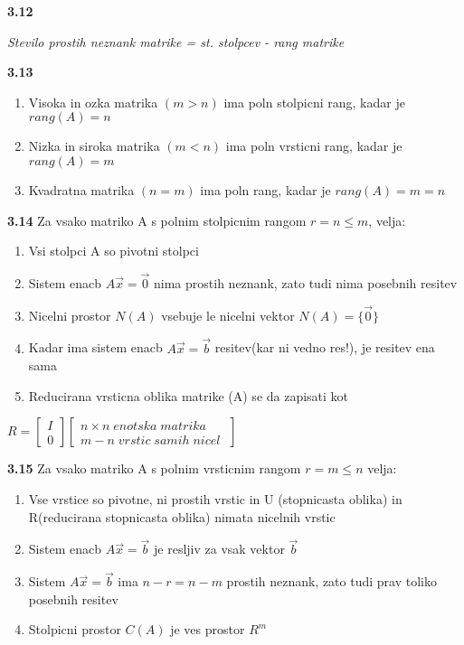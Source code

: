 \documentclass{article}
\begin{document}
\begin{multicols}{2}
	\textbf{3.12}
	\begin{center}
		\textit{Stevilo prostih neznank matrike = st. stolpcev - rang matrike}
	\end{center}

	\textbf{3.13}
	\begin{enumerate}
		\item Visoka in ozka matrika $(m > n)$ ima poln stolpicni rang, kadar je $rang(A) = n$
		\item Nizka in siroka matrika $(m < n)$ ima poln vrsticni rang, kadar je $rang(A) = m$
		\item Kvadratna matrika $(n = m)$ ima poln rang, kadar je $rang(A) = m = n$
	\end{enumerate}

	\textbf{3.14} Za vsako matriko A s polnim stolpicnim rangom $r = n \leq m$, velja:
	\begin{enumerate}
		\item Vsi stolpci A so pivotni stolpci
		\item Sistem enacb $A\vec{x} = \vec{0}$ nima prostih neznank, zato tudi nima posebnih resitev
		\item Nicelni prostor $N(A)$ vsebuje le nicelni vektor $N(A) = \{\vec{0}\}$
		\item Kadar ima sistem enacb $A\vec{x} = \vec{b}$ resitev(kar ni vedno res!), je resitev ena sama
		\item Reducirana vrsticna oblika matrike (A) se da zapisati kot
	\end{enumerate}
	\begin{center}
		$R =
			\begin{bmatrix}
				I \\
				0
			\end{bmatrix}
			\begin{bmatrix}
				n \times n\; enotska\; matrika \\
				m - n\; vrstic\; samih\; nicel\;
			\end{bmatrix}
		$
	\end{center}

	\textbf{3.15} Za vsako matriko A s polnim vrsticnim rangom $r = m \leq n$ velja:
	\begin{enumerate}
		\item Vse vrstice so pivotne, ni prostih vrstic in U (stopnicasta oblika) in R(reducirana stopnicasta oblika) nimata nicelnih vrstic
		\item Sistem enacb $A\vec{x} = \vec{b}$ je resljiv za vsak vektor $\vec{b}$
		\item Sistem $A\vec{x} = \vec{b}$ ima $n-r = n-m$ prostih neznank, zato tudi prav toliko posebnih resitev
		\item Stolpicni prostor $C(A)$ je ves prostor $R^{m}$
	\end{enumerate}


\end{multicols}
\end{document}
